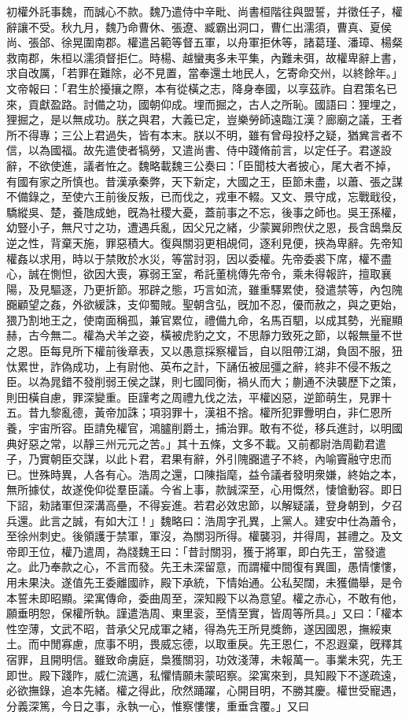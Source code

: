 \begin{pinyinscope}
初權外託事魏，而誠心不款。魏乃遣侍中辛毗、尚書桓階往與盟誓，并徵任子，權辭讓不受。秋九月，魏乃命曹休、張遼、臧霸出洞口，曹仁出濡須，曹真、夏侯尚、張郃、徐晃圍南郡。權遣呂範等督五軍，以舟軍拒休等，諸葛瑾、潘璋、楊粲救南郡，朱桓以濡須督拒仁。時楊、越蠻夷多未平集，內難未弭，故權卑辭上書，求自改厲，「若罪在難除，必不見置，當奉還土地民人，乞寄命交州，以終餘年。」文帝報曰：「君生於擾攘之際，本有從橫之志，降身奉國，以享茲祚。自君策名已來，貢獻盈路。討備之功，國朝仰成。埋而掘之，古人之所恥。國語曰：狸埋之，狸掘之，是以無成功。朕之與君，大義已定，豈樂勞師遠臨江漢？廊廟之議，王者所不得專；三公上君過失，皆有本末。朕以不明，雖有曾母投杼之疑，猶兾言者不信，以為國福。故先遣使者犒勞，又遣尚書、侍中踐脩前言，以定任子。君遂設辭，不欲使進，議者恠之。魏略載魏三公奏曰：「臣聞枝大者披心，尾大者不掉，有國有家之所慎也。昔漢承秦弊，天下新定，大國之王，臣節未盡，以蕭、張之謀不備錄之，至使六王前後反叛，已而伐之，戎車不輟。又文、景守成，忘戰戢役，驕縱吳、楚，養虺成虵，旣為社稷大憂，蓋前事之不忘，後事之師也。吳王孫權，幼豎小子，無尺寸之功，遭遇兵亂，因父兄之緒，少蒙翼卵煦伏之恩，長含鴟梟反逆之性，背棄天施，罪惡積大。復與關羽更相覘伺，逐利見便，挾為卑辭。先帝知權姦以求用，時以于禁敗於水災，等當討羽，因以委權。先帝委裘下席，權不盡心，誠在惻怛，欲因大喪，寡弱王室，希託董桃傳先帝令，乘未得報許，擅取襄陽，及見驅逐，乃更折節。邪辟之態，巧言如流，雖重驛累使，發遣禁等，內包隗嚻顧望之姦，外欲緩誅，支仰蜀賊。聖朝含弘，旣加不忍，優而赦之，與之更始，猥乃割地王之，使南面稱孤，兼官累位，禮備九命，名馬百駟，以成其勢，光寵顯赫，古今無二。權為犬羊之姿，橫被虎豹之文，不思靜力致死之節，以報無量不世之恩。臣每見所下權前後章表，又以愚意採察權旨，自以阻帶江湖，負固不服，狃忲累世，詐偽成功，上有尉他、英布之計，下誦伍被屈彊之辭，終非不侵不叛之臣。以為晁錯不發削弱王侯之謀，則七國同衡，禍乆而大；蒯通不決襲歷下之策，則田橫自慮，罪深變重。臣謹考之周禮九伐之法，平權凶惡，逆節萌生，見罪十五。昔九黎亂德，黃帝加誅；項羽罪十，漢祖不捨。權所犯罪釁明白，非仁恩所養，宇宙所容。臣請免權官，鴻臚削爵土，捕治罪。敢有不從，移兵進討，以明國典好惡之常，以靜三州元元之苦。」其十五條，文多不載。又前都尉浩周勸君遣子，乃實朝臣交謀，以此卜君，君果有辭，外引隗嚻遣子不終，內喻竇融守忠而已。世殊時異，人各有心。浩周之還，口陳指麾，益令議者發明衆嫌，終始之本，無所據仗，故遂俛仰從羣臣議。今省上事，款誠深至，心用慨然，悽愴動容。即日下詔，勑諸軍但深溝高壘，不得妄進。若君必效忠節，以解疑議，登身朝到，夕召兵還。此言之誠，有如大江！」魏略曰：浩周字孔異，上黨人。建安中仕為蕭令，至徐州刺史。後領護于禁軍，軍沒，為關羽所得。權襲羽，并得周，甚禮之。及文帝即王位，權乃遣周，為牋魏王曰：「昔討關羽，獲于將軍，即白先王，當發遣之。此乃奉款之心，不言而發。先王未深留意，而謂權中間復有異圖，愚情慺慺，用未果決。遂值先王委離國祚，殿下承統，下情始通。公私契闊，未獲備舉，是令本誓未即昭顯。梁寓傳命，委曲周至，深知殿下以為意望。權之赤心，不敢有他，願垂明恕，保權所執。謹遣浩周、東里衮，至情至實，皆周等所具。」又曰：「權本性空薄，文武不昭，昔承父兄成軍之緒，得為先王所見獎飾，遂因國恩，撫綏東土。而中閒寡慮，庶事不明，畏威忘德，以取重戾。先王恩仁，不忍遐棄，旣釋其宿罪，且開明信。雖致命虜庭，梟獲關羽，功效淺薄，未報萬一。事業未究，先王即世。殿下踐阼，威仁流邁，私懼情願未蒙昭察。梁寓來到，具知殿下不遂疏遠，必欲撫錄，追本先緒。權之得此，欣然踊躍，心開目明，不勝其慶。權世受寵遇，分義深篤，今日之事，永執一心，惟察慺慺，重垂含覆。」又曰
\end{pinyinscope}
